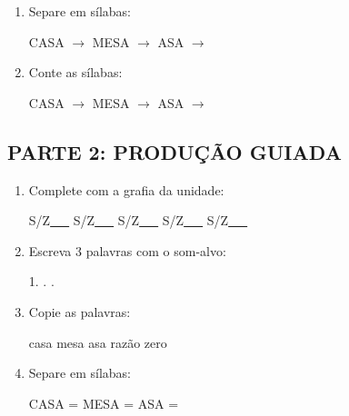 \begin{exercicio}
\begin{enumerate}
  \item Separe em sílabas:
  \begin{center}
  CASA $\rightarrow$ \underline{\hspace{1cm}} \quad MESA $\rightarrow$ \underline{\hspace{1cm}} \quad ASA $\rightarrow$ \underline{\hspace{1cm}}
  \end{center}

  \item Conte as sílabas:
  \begin{center}
  CASA $\rightarrow$ \underline{\hspace{0.9cm}} \quad MESA $\rightarrow$ \underline{\hspace{0.9cm}} \quad ASA $\rightarrow$ \underline{\hspace{0.9cm}}
  \end{center}

\end{enumerate}

\subsection*{PARTE 2: PRODUÇÃO GUIADA}

\begin{enumerate}[resume]

  \item Complete com a grafia da unidade:
  \begin{center}
  S/Z\underline{~~~} \quad S/Z\underline{~~~} \quad S/Z\underline{~~~} \quad S/Z\underline{~~~} \quad S/Z\underline{~~~}
  \end{center}

  \item Escreva 3 palavras com o som-alvo:
  \begin{center}
  1. \underline{\hspace{3cm}} . \underline{\hspace{3cm}} . \underline{\hspace{3cm}}
  \end{center}

  \item Copie as palavras:
  \begin{center}
  casa \quad mesa \quad asa \quad razão \quad zero
  \end{center}

  \item Separe em sílabas:
  \begin{center}
  CASA = \underline{\hspace{1cm}} \underline{\hspace{1cm}} \quad MESA = \underline{\hspace{1cm}} \underline{\hspace{1cm}} \quad ASA = \underline{\hspace{1cm}} \underline{\hspace{1cm}}
  \end{center}


\end{enumerate}
\end{exercicio}
